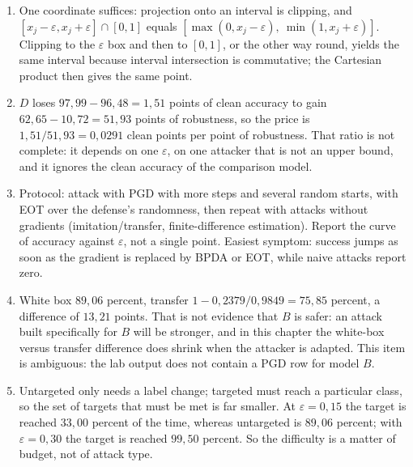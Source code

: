 \begin{enumerate}[label=\textbf{29.\arabic*}]
  \item One coordinate suffices: projection onto an interval is clipping, and
        $[x_{j}-\varepsilon,x_{j}+\varepsilon]\cap[0,1]$ equals
        $[\max(0,x_{j}-\varepsilon),\ \min(1,x_{j}+\varepsilon)]$. Clipping to the
        $\varepsilon$ box and then to $[0,1]$, or the other way round, yields the
        same interval because interval intersection is commutative; the Cartesian product
        then gives the same point.

  \item $D$ loses $97{,}99-96{,}48=1{,}51$ points of clean accuracy to
        gain $62{,}65-10{,}72=51{,}93$ points of robustness, so the price is
        $1{,}51/51{,}93=0{,}0291$ clean points per point of robustness. That ratio is not
        complete: it depends on one $\varepsilon$, on one attacker that is
        not an upper bound, and it ignores the clean accuracy of the comparison model.

  \item Protocol: attack with PGD with more steps and several random starts,
        with EOT over the defense's randomness, then repeat with attacks without
        gradients (imitation/transfer, finite-difference estimation). Report the curve of accuracy
        against $\varepsilon$, not a single point. Easiest symptom: success
        jumps as soon as the gradient is replaced by BPDA or EOT, while naive attacks
        report zero.

  \item White box $89{,}06$ percent, transfer $1-0{,}2379/0{,}9849=75{,}85$
        percent, a difference of $13{,}21$ points. That is not evidence that $B$ is safer:
        an attack built specifically for $B$ will be stronger, and in this chapter the
        white-box versus transfer difference does shrink when the attacker is adapted.
        This item is ambiguous: the lab output does not contain a PGD row for model $B$.

  \item Untargeted only needs a label change; targeted must reach a particular
        class, so the set of targets that must be met is far smaller. At
        $\varepsilon=0{,}15$ the target is reached $33{,}00$ percent of the time, whereas
        untargeted is $89{,}06$ percent; with $\varepsilon=0{,}30$ the target is reached
        $99{,}50$ percent. So the difficulty is a matter of budget, not of attack type.
\end{enumerate}

